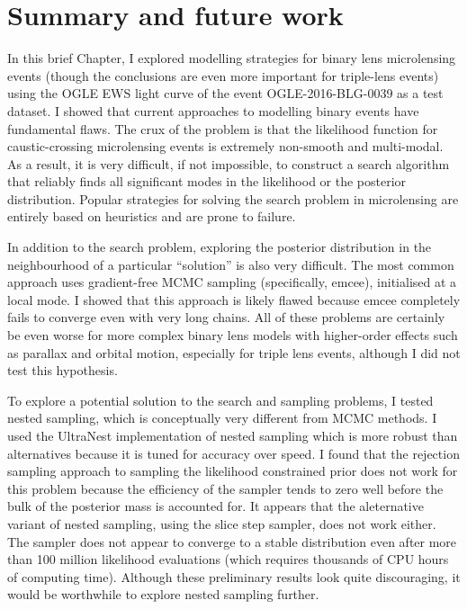 \documentclass[12pt,dvipsnames]{report}
\newcommand{\ssf}[1]{\textsf{#1}}
\begin{document}
\section{Summary and future work}
In this brief Chapter, I explored modelling strategies for binary lens microlensing events
(though the conclusions are even more important for triple-lens events)
using the OGLE EWS light curve of the event OGLE-2016-BLG-0039 as a test dataset. 
I showed that current approaches to modelling binary events have fundamental flaws. 
The crux of the problem is that the likelihood function for caustic-crossing microlensing 
events is extremely non-smooth and multi-modal. As a result, 
it is very difficult, if not impossible, to construct a search algorithm that reliably 
finds all significant modes in the likelihood or the posterior distribution. 
Popular strategies for solving the search problem in microlensing are entirely based on heuristics 
and are prone to failure. 

In addition to the search problem, exploring the 
posterior distribution in the neighbourhood of a particular ``solution'' is also very difficult.
The most common approach uses  gradient-free MCMC sampling (specifically, \ssf{emcee}),
initialised at a local mode.
I showed that this approach is likely flawed because \ssf{emcee} completely fails to converge even 
with very long chains. 
All of these problems are certainly be even worse for more complex binary lens models 
with higher-order effects such as parallax and orbital motion, especially for triple 
lens events, although I did not test this hypothesis.

To explore a potential solution to the search and sampling problems, I tested nested sampling,
which is conceptually very different from MCMC methods.
I used the \ssf{UltraNest} implementation of nested sampling which 
is more robust than alternatives because it is tuned for accuracy over speed.
I found that the rejection sampling approach to sampling the likelihood constrained prior 
does not work for this problem because the efficiency of the sampler tends to zero well 
before the bulk of the posterior mass is accounted for.
It appears that the aleternative variant of nested sampling, using the slice step sampler,
does not work either.
The sampler does not appear to converge to a stable distribution even
after more than 100 million likelihood evaluations (which requires thousands of CPU 
hours of computing time). Although these preliminary results look quite discouraging,
it would be worthwhile to explore nested sampling further. 
\end{document}
